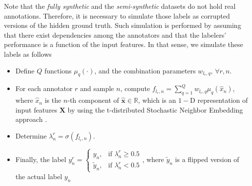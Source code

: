 \documentclass[journal]{IEEEtran}
\providecommand{\ve}[1]{{\bm{#1}}}%
\providecommand{\mat}[1]{{\bm{#1}}} %
\newcommand{\Real}{\mathbb{R}}
\providecommand{\ve}[1]{{\mathbf{#1}}}
\providecommand{\mat}[1]{{\mathbf{#1}}}
\begin{document}
\begin{table}[!tb]
	\caption{Datasets used for classification.
	}
	\label{tab:ClaData}
	\centering
\end{table}
Note that the \textit{fully synthetic} and the \textit{semi-synthetic} datasets do not hold real annotations. Therefore, it is necessary to simulate those labels as corrupted versions of the hidden ground truth. Such simulation is performed by assuming that there exist dependencies among the annotators and that the labelers' performance is a function of the input features. In that sense, we simulate these labels as follows
\begin{itemize}
    \item Define $Q$ functions $\mu_q(\cdot)$, and the combination parameters $w_{l_r,q},\,\forall r, n$.
    \item For each annotator $r$ and sample $n$, compute $f_{l_r,n} = \sum_{q=1}^{Q}w_{l_r,q}\mu_q(\hat{x}_n)$, where $\hat{x}_n$ is the $n$-th component of $\hat{\ve{x}}\in \Real$, which is an $1-$D representation of input features $\mat{X}$ by using the t-distributed Stochastic Neighbor Embedding approach \cite{maaten2008visualizing}.
    \item Determine $\lambda_{n}^r = \sigma(f_{l_r,n})$. 
    \item Finally, the label $y_n^r = \begin{cases}y_n, &\mbox{if }\lambda_{n}^r \ge 0.5\\ \tilde{y}_n, & \mbox{if }\lambda_{n}^r <0.5 \end{cases}$, where $\tilde{y}_n$ is a flipped version of the actual label $y_n$
\end{itemize}
\end{document}

